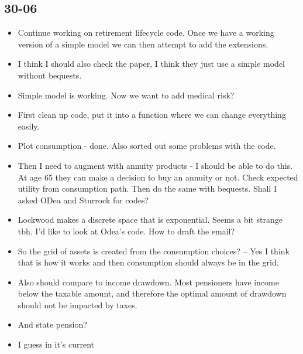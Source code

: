\documentclass[12pt]{article}
\begin{document}
\subsection{\textbf{30-06}}
\begin{itemize}


      \item Continue working on retirement lifecycle code. Once we have a
            working version of a simple model we can then attempt to add the
            extensions.

      \item I think I should also check the \cite{odea_sturrock_rest_2023}
            paper, I think they just use a simple model without bequests.

      \item Simple model is working. Now we want to add medical risk?
      \item First clean up code, put it into a function where we can change
            everything easily.

      \item Plot consumption - done. Also sorted out some problems with the
            code.
      \item Then I need to augment with annuity products - I should be able to
            do this. At age 65 they can make a decision to buy an annuity or
            not. Check expected utility from consumption path. Then do the same
            with bequests. Shall I asked ODea and Sturrock for codes?

      \item Lockwood makes a discrete space that is exponential. Seems a bit
            strange tbh. I'd like to look at Odea's code. How to draft the
            email?

      \item So the grid of assets is created from the consumption choices? --
            Yes I think that is how it works and then consumption should always
            be in the grid.


      \item Also should compare to income drawdown. Most pensioners have income
            below the taxable amount, and therefore the optimal amount of
            drawdown should not be impacted by taxes.
      \item And state pension?
      \item I guess in it's current

\end{itemize}
\end{document}
